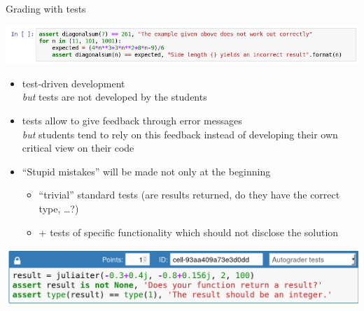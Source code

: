\documentclass[svgnames]{beamer}
\newcommand\but{\alert{\textit{but}} }
\begin{document}
\begin{frame}{Grading with tests}
 \begin{center}
  \includegraphics[width=\textwidth]{tests}
 \end{center}

 \vspace{0.3truecm}
 \begin{itemize}
  \item test-driven development\\
	\but tests are not developed by the students
  \item tests allow to give feedback through error messages\\
	\but students tend to rely on this feedback instead of developing their
	own critical view on their code
  \item ``Stupid mistakes'' will be made not only at the beginning
	\begin{itemize}
         \item ``trivial'' standard tests (are results returned, do they have the correct type, \dots?)
	 \item + tests of specific functionality which should not disclose the solution
	\end{itemize}
 \end{itemize}
 \begin{center}
  \includegraphics[width=\textwidth]{answer_tests_unittest1}
 \end{center}
\end{frame}
\end{document}
